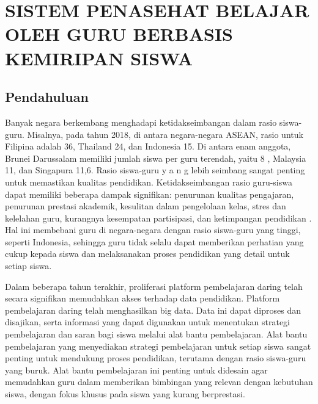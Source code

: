 \chapter{SISTEM PENASEHAT BELAJAR OLEH GURU BERBASIS KEMIRIPAN SISWA}

\section{Pendahuluan}

    Banyak negara berkembang menghadapi ketidakseimbangan dalam rasio siswa- guru. Misalnya, pada tahun 2018, di antara negara-negara ASEAN, rasio untuk Filipina adalah 36, Thailand 24, dan Indonesia 15. Di antara enam anggota, Brunei Darussalam memiliki jumlah siswa per guru terendah, yaitu 8 , Malaysia 11, dan Singapura 11,6. Rasio siswa-guru y a n g lebih seimbang sangat penting untuk memastikan kualitas pendidikan. Ketidakseimbangan rasio guru-siswa dapat memiliki beberapa dampak signifikan: penurunan kualitas pengajaran, penurunan prestasi akademik, kesulitan dalam pengelolaan kelas, stres dan kelelahan guru, kurangnya kesempatan partisipasi, dan ketimpangan pendidikan \citep{Ancho2021}. Hal ini membebani guru di negara-negara dengan rasio siswa-guru yang tinggi, seperti Indonesia, sehingga guru tidak selalu dapat memberikan perhatian yang cukup kepada siswa dan melaksanakan proses pendidikan yang detail untuk setiap siswa.

    Dalam beberapa tahun terakhir, proliferasi platform pembelajaran daring telah secara signifikan memudahkan akses terhadap data pendidikan. Platform pembelajaran daring telah menghasilkan big data. Data ini dapat diproses dan disajikan, serta informasi yang dapat digunakan untuk menentukan strategi pembelajaran dan saran bagi siswa melalui alat bantu pembelajaran. Alat bantu pembelajaran yang menyediakan strategi pembelajaran untuk setiap siswa sangat penting untuk mendukung proses pendidikan, terutama dengan rasio siswa-guru yang buruk. Alat bantu pembelajaran ini penting untuk didesain agar memudahkan guru dalam memberikan bimbingan yang relevan dengan kebutuhan siswa, dengan fokus khusus pada siswa yang kurang berprestasi.
    
